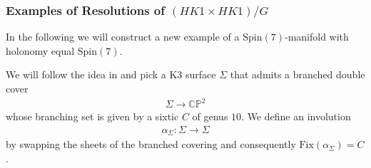 \documentclass[psamsfonts]{amsart}
\theoremstyle{plain}
\theoremstyle{definition}{
\newtheorem{defi}{Definition}[section]
\newtheorem{ass}{Assumption}
\newtheorem*{nota}{Notation}}
\theoremstyle{remark}{
\newtheorem{rem}{Remark}
\newtheorem{ex}{Example}}
\theoremstyle{plain}{
\newtheorem{thm}{Theorem}[section]
\newtheorem{lem}{Lemma}[section]
\newtheorem{cor}{Corollary}[section]
\newtheorem{prop}{Proposition}[section]
\newtheorem{con}{Conjecture}[section]}
\newcommand{\m}[1]{{\mathrm{#1}}}
\begin{document}
\subsubsection{Examples of Resolutions of $(HK1\times HK1)/G$}
\label{Examples of Resolutions of (HK1xHK1)/G}

In the following we will construct a new example of a $\m{Spin}(7)$-manifold with holonomy equal $\m{Spin}(7)$.

\begin{ex}
We will follow the idea in \cite[Chap. 7.3]{joyce2017new} and pick a K3 surface $\Sigma$ that admits a branched double cover
\begin{align*}
    \Sigma\rightarrow\mathbb{CP}^2
\end{align*}
whose branching set is given by a sixtic $C$ of genus $10$. We define an involution
\begin{align*}
    \alpha_{\Sigma}\colon \Sigma\rightarrow \Sigma
\end{align*}
by swapping the sheets of the branched covering and consequently $\m{Fix}(\alpha_{\Sigma})=C$.\\ 


\end{ex}
\end{document}
